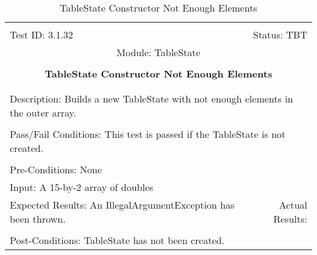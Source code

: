 \documentclass[titlepage]{article}
\begin{document}
\begin{center}%
\begin{table}
\begin{tabular}{|l r|}\hline&\\[-2mm]
	Test ID: 3.1.32	&Status: TBT\\[-3mm]
	\multicolumn{2}{|c|}{Module: TableState}\\&\\
	\multicolumn{2}{|c|}{\textbf{\large{TableState Constructor Not Enough Elements}}}\\&\\\hline&\\[-3mm]
	\multicolumn{2}{|p{\textwidth}|}{Description: Builds a new TableState with not enough elements in the outer array.}\\[1mm]\hline&\\[-3mm]
	\multicolumn{2}{|p{\textwidth}|}{Pass/Fail Conditions: This test is passed if the TableState is not created.}\\[1mm]\hline&\\[-3mm]
	\multicolumn{2}{|p{\textwidth}|}{Pre-Conditions: None}\\[4mm]
	\multicolumn{2}{|p{\textwidth}|}{Input: A 15-by-2 array of doubles}\\[2mm]\hline
	\multicolumn{1}{|p{0.49\textwidth}}{Expected Results: An IllegalArgumentException has been thrown.}	&\multicolumn{1}{|p{0.45\textwidth}|}{Actual Results: }\\\hline&\\[-3mm]
	\multicolumn{2}{|p{\textwidth}|}{Post-Conditions: TableState has not been created.}\\\hline
\end{tabular}
\caption{TableState Constructor Not Enough Elements}
\end{table}
\end{center}
\end{document}
